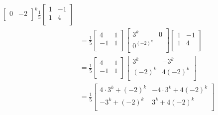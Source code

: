\documentclass{article}
\begin{document}
\begin{example}
\begin{align*}
\begin{bmatrix}
          0 & -2\\
        \end{bmatrix}^k\frac{1}{5}
        \begin{bmatrix}
          1 & -1\\
          1 & 4\\
        \end{bmatrix}\\
        &= \frac{1}{5}
        \begin{bmatrix}
          4 & 1\\
          -1 & 1\\
        \end{bmatrix}
        \begin{bmatrix}
          3^k & 0\\
          0 ^ (-2)^k\\
        \end{bmatrix}
        \begin{bmatrix}
          1 & -1\\
          1 & 4\\
        \end{bmatrix}\\
        &= \frac{1}{5}
        \begin{bmatrix}
          4 & 1\\
          -1 & 1\\
        \end{bmatrix}
        \begin{bmatrix}
          3^k & -3^k\\
          (-2)^k & 4(-2)^k\\
        \end{bmatrix}\\
        &= \frac{1}{5}
        \begin{bmatrix}
          4 \cdot 3^k + (-2)^k & -4 \cdot 3^k + 4(-2)^k\\
          -3^k + (-2)^k & 3^k + 4(-2)^k\\
        \end{bmatrix}
      \end{align*}
    \end{example}
\end{document}
